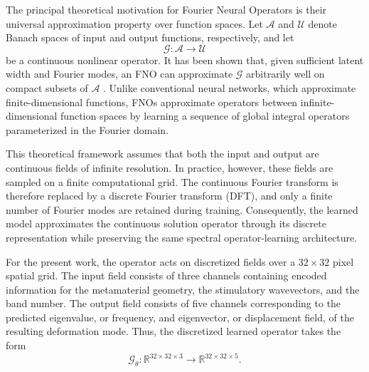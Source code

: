 \documentclass[preprint,review,12pt]{elsarticle}
\begin{document}
The principal theoretical motivation for Fourier Neural Operators is their universal approximation property over function spaces. Let $\mathcal{A}$ and $\mathcal{U}$ denote Banach spaces of input and output functions, respectively, and let
\begin{equation}
\mathcal{G}:\mathcal{A}\rightarrow\mathcal{U}
\end{equation}
be a continuous nonlinear operator. It has been shown that, given sufficient latent width and Fourier modes, an FNO can approximate $\mathcal{G}$ arbitrarily well on compact subsets of $\mathcal{A}$ . Unlike conventional neural networks, which approximate finite-dimensional functions, FNOs approximate operators between infinite-dimensional function spaces by learning a sequence of global integral operators parameterized in the Fourier domain.

This theoretical framework assumes that both the input and output are continuous fields of infinite resolution. In practice, however, these fields are sampled on a finite computational grid. The continuous Fourier transform is therefore replaced by a discrete Fourier transform (DFT), and only a finite number of Fourier modes are retained during training. Consequently, the learned model approximates the continuous solution operator through its discrete representation while preserving the same spectral operator-learning architecture.

For the present work, the operator acts on discretized fields over a $32\times32$ pixel spatial grid. The input field consists of three channels containing encoded information for the metamaterial geometry, the stimulatory wavevectors, and the band number. The output field consists of five channels corresponding to the predicted eigenvalue, or frequency, and eigenvector, or displacement field, of the resulting deformation mode. Thus, the discretized learned operator takes the form
\begin{equation}
\mathcal{G}_{\theta}:
\mathbb{R}^{32\times32\times3}
\rightarrow
\mathbb{R}^{32\times32\times5}.
\end{equation}
\end{document}
